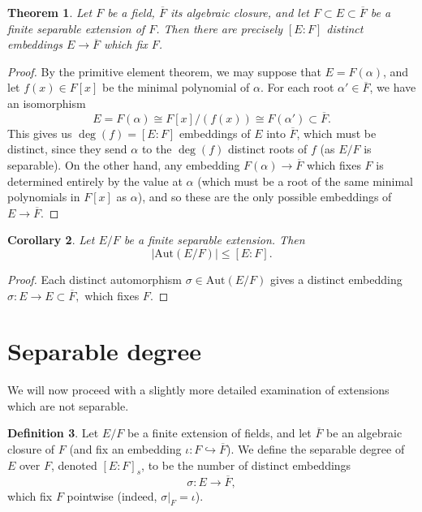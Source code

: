 \documentclass[12pt]{report}
\newtheorem{theorem}{Theorem}[section]
\newtheorem{corollary}[theorem]{Corollary}
\theoremstyle{definition}
\newtheorem{definition}[theorem]{Definition}
\newcommand{\Aut}{\text{Aut}}
\begin{document}
\begin{theorem}\label{acc}
	Let $F$ be a field, $\overline{F}$ its algebraic closure, and let $F \subset E \subset \overline{F}$ be a finite separable extension of $F$. Then there are precisely $[E:F]$ distinct embeddings $E\to \overline{F}$ which fix $F$.
\end{theorem}

\begin{proof}
	By the primitive element theorem, we may suppose that $E = F(\alpha)$, and let $f(x) \in F[x]$ be the minimal polynomial of $\alpha$. For each root $\alpha' \in \overline{F}$, we have an isomorphism $$E = F(\alpha) \cong F[x]/(f(x)) \cong F(\alpha') \subset \overline{F}.$$
	This gives us $\deg(f) = [E:F]$ embeddings of $E$ into $\overline{F}$, which must be distinct, since they send $\alpha$ to the $\deg(f)$ distinct roots of $f$ (as $E/F$ is separable).
	On the other hand, any embedding $F(\alpha) \to \overline{F}$ which fixes $F$ is determined entirely by the value at $\alpha$ (which must be a root of the same minimal polynomials in $F[x]$ as $\alpha$), and so these are the only possible embeddings of $E \to \overline{F}$.
\end{proof}

\begin{corollary}\label{cor1}
	Let $E/F$ be a finite separable extension. Then
	$$|\Aut(E/F)| \leq [E:F].$$
\end{corollary}

\begin{proof}
	Each distinct automorphism $\sigma\in\Aut(E/F)$ gives a distinct embedding $\sigma : E \to E \subset \overline{F},$ which fixes $F$.
\end{proof}

\section{Separable degree}

We will now proceed with a slightly more detailed examination of extensions which are not separable.

\begin{definition}
	Let $E/F$ be a finite extension of fields, and let $\overline{F}$ be an algebraic closure of $F$ (and fix an embedding $\iota: F\hookrightarrow\overline{F}$). We define the separable degree of $E$ over $F$, denoted $[E : F]_s$, to be the number of distinct embeddings $$\sigma: E\to \overline{F},$$ which fix $F$ pointwise (indeed, $\sigma|_F=\iota$).
\end{definition}
\end{document}
